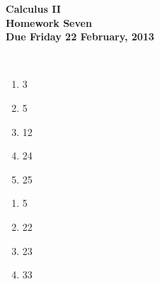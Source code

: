 \documentclass[12pt]{article}
\begin{document}
\pagestyle{empty}
 
\begin{center}
{\large {\bf Calculus II}}\\
\medskip
{\large {\bf Homework Seven}}\\
\medskip
{ {\bf Due Friday 22 February, 2013}}\\
\end{center}

\hspace{2mm}\\
   

\begin{enumerate}
\setlength{\itemsep}{-1mm}
  \item 3
  \item 5
  \item 12
  \item 24
  \item 25
\end{enumerate}



\begin{enumerate}
\setlength{\itemsep}{-1mm}
  \item 5
  \item 22
  \item 23
  \item 33
\end{enumerate}




%

\end{document}
